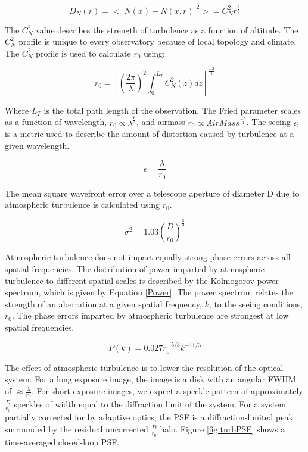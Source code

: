 \begin{equation}
    D_N(r)=<|N(x)-N(x,r)|^2>=C_N^2r^{\frac{2}{3}}
\end{equation}

The $C_N^2$ value describes the strength of turbulence as a function of altitude. The $C_N^2$ profile is unique to every observatory because of local topology and climate. The $C_N^2$ profile is used to calculate $r_0$ using:

\begin{equation}
    r_0=[(\frac{2\pi}{\lambda})^2 \int_0^{L_T} C_N^2(z)dz]^{\frac{-3}{5}}
\end{equation}
 
 Where $L_T$ is the total path length of the observation. The Fried parameter scales as a function of wavelength, $r_0 \propto \lambda^{\frac{6}{5}}$, and airmass $r_0 \propto AirMass^{\frac{-5}{3}}$. The seeing $\epsilon$, is a metric used to describe the amount of distortion caused by turbulence at a given wavelength.
 
 \begin{equation}
     \epsilon=\frac{\lambda}{r_0}
 \end{equation}
 
 The mean square wavefront error over a telescope aperture of diameter D due to atmospheric turbulence is calculated using $r_0$.
 
 \begin{equation}
     \sigma^2=1.03(\frac{D}{r_0})^{\frac{5}{3}}
 \end{equation}


Atmospheric turbulence does not impart equally strong phase errors across all spatial frequencies. The distribution of power imparted by atmospheric turbulence to different spatial scales is described by the Kolmogorov power spectrum, which is given by Equation \ref{Power}\cite{rampy2012production}. The power spectrum relates the strength of an aberration at a given spatial frequency, $k$, to the seeing conditions, $r_0$. The phase errors imparted by atmospheric turbulence are strongest at low spatial frequencies.

\begin{equation}
    P(k)=0.027r_0^{-5/3}k^{-11/3}
    \label{Power}
\end{equation}



The effect of atmospheric turbulence is to lower the resolution of the optical system. For a long exposure image, the image is a disk with an angular FWHM of $\approx \frac{\lambda}{r_0 }$. For short exposure images, we expect a speckle pattern of approximately $\frac{D}{r_0}$ speckles of width equal to the diffraction limit of the system. For a system partially corrected for by adaptive optics, the PSF is a diffraction-limited peak surrounded by the residual uncorrected $\frac{D}{r_0}$ halo. Figure \ref{fig:turbPSF} shows a time-averaged closed-loop PSF.

